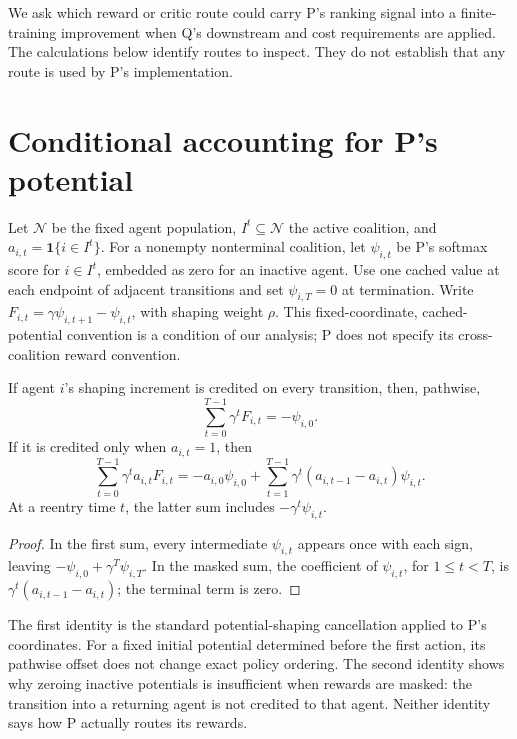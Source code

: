 \documentclass{article}
\begin{document}
We ask which reward or critic route could carry P's ranking signal into a finite-training improvement when
Q's downstream and cost requirements are applied. The calculations below identify routes to inspect. They do
not establish that any route is used by P's implementation. %

\section{Conditional accounting for P's potential}

Let \(\mathcal N\) be the fixed agent population, \(I^t\subseteq\mathcal N\) the active coalition, and
\(a_{i,t}=\mathbf 1\{i\in I^t\}\). For a nonempty nonterminal coalition, let \(\psi_{i,t}\) be P's softmax
score for \(i\in I^t\), embedded as zero for an inactive agent. Use one cached value at each endpoint of
adjacent transitions and set \(\psi_{i,T}=0\) at termination. Write
\(F_{i,t}=\gamma\psi_{i,t+1}-\psi_{i,t}\), with shaping weight \(\rho\). This fixed-coordinate,
cached-potential convention is a condition of our analysis; P does not specify its cross-coalition reward
convention. %

\begin{proposition}
If agent \(i\)'s shaping increment is credited on every transition, then, pathwise,
\[
\sum_{t=0}^{T-1}\gamma^t F_{i,t}=-\psi_{i,0}.
\]
If it is credited only when \(a_{i,t}=1\), then
\[
\sum_{t=0}^{T-1}\gamma^t a_{i,t}F_{i,t}
=-a_{i,0}\psi_{i,0}
+\sum_{t=1}^{T-1}\gamma^t(a_{i,t-1}-a_{i,t})\psi_{i,t}.
\]
At a reentry time \(t\), the latter sum includes \(-\gamma^t\psi_{i,t}\).
\end{proposition}
\begin{proof}
In the first sum, every intermediate \(\psi_{i,t}\) appears once with each sign, leaving
\(-\psi_{i,0}+\gamma^T\psi_{i,T}\). In the masked sum, the coefficient of \(\psi_{i,t}\), for \(1\leq t<T\),
is \(\gamma^t(a_{i,t-1}-a_{i,t})\); the terminal term is zero. %
\end{proof}

The first identity is the standard potential-shaping cancellation applied to P's coordinates. For a fixed
initial potential determined before the first action, its pathwise offset does not change exact policy
ordering. The second identity shows why zeroing inactive potentials is insufficient when rewards are masked:
the transition into a returning agent is not credited to that agent. Neither identity says how P actually
routes its rewards. %
\end{document}
